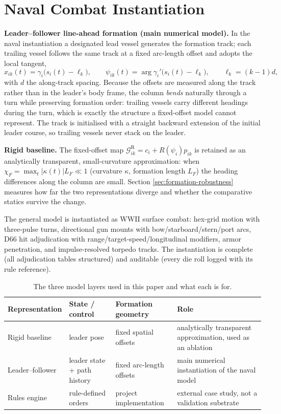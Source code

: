 \documentclass[12pt,a4paper]{article}
\begin{document}
\section{Naval Combat Instantiation}\label{sec:naval}

\noindent\textbf{Leader--follower line-ahead formation (main numerical
model).}  In the naval instantiation a designated lead vessel generates the
formation track; each trailing vessel follows the same track at a fixed
arc-length offset and adopts the local tangent,
\begin{equation}
x_{ik}(t)=\gamma_i\bigl(s_i(t)-\ell_k\bigr),
\qquad
\psi_{ik}(t)=\arg\gamma_i'\bigl(s_i(t)-\ell_k\bigr),
\qquad
\ell_k = (k-1)d ,
\label{eq:lf}
\end{equation}
with $d$ the along-track spacing.  Because the offsets are measured along the
track rather than in the leader's body frame, the column \emph{bends}
naturally through a turn while preserving formation order: trailing vessels
carry different headings during the turn, which is exactly the structure a
fixed-offset model cannot represent.  The track is initialised with a
straight backward extension of the initial leader course, so trailing
vessels never stack on the leader.

\noindent\textbf{Rigid baseline.}  The fixed-offset map
$\mathcal G^{\mathrm{R}}_{ik}=c_i+R(\psi_i)p_{ik}$ is retained as an
analytically transparent, small-curvature approximation: when
$\chi_F=\max_t|\kappa(t)|L_F\ll1$ (curvature $\kappa$, formation length
$L_F$) the heading differences along the column are small.  Section
\ref{sec:formation-robustness} measures how far the two representations
diverge and whether the comparative statics survive the change.

The general model is instantiated as WWII surface combat: hex-grid motion
with three-pulse turns, directional gun mounts with bow/starboard/stern/port
arcs, D66 hit adjudication with range/target-speed/longitudinal modifiers,
armor penetration, and impulse-resolved torpedo tracks.  The instantiation
is complete (all adjudication tables structured) and auditable (every die
roll logged with its rule reference).

\begin{table}[!htb]
\centering\small
\caption{The three model layers used in this paper and what each is for.}
\label{tab:layers}
\begin{tabular}{p{2.5cm}p{3.2cm}p{3.4cm}p{3.6cm}}
\toprule
Representation & State / control & Formation geometry & Role \\
\midrule
Rigid baseline & leader pose & fixed spatial offsets & analytically transparent
approximation, used as an ablation \\
Leader--follower & leader state + path history & fixed arc-length offsets &
main numerical instantiation of the naval model \\
Rules engine & rule-defined orders & project implementation &
external case study, not a validation substrate \\
\bottomrule
\end{tabular}
\end{table}
\end{document}
